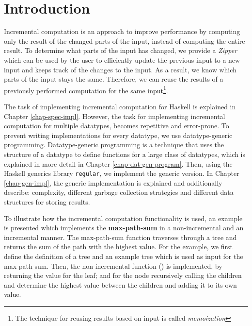 \chapter{Introduction}



Incremental computation is an approach to improve performance by computing only the result of the changed parts of the input, instead of computing the entire result. To determine what parts of the input has changed, we provide a \textit{Zipper} which can be used by the user to efficiently update the previous input to a new input and keeps track of the changes to the input. As a result, we know which parts of the input stays the same. Therefore, we can reuse the results of a previously performed computation for the same input\footnote{The technique for reusing results based on input is called \textit{memoization}}.   

The task of implementing incremental computation for Haskell is explained in Chapter \ref*{chap-spec-impl}. However, the task for implementing incremental computation for multiple datatypes, becomes repetitive and error-prone. To prevent writing implementations for every datatype, we use datatype-generic programming. Datatype-generic programming is a technique that uses the structure of a datatype to define functions for a large class of datatypes, which is explained in more detail in Chapter \ref*{chap-dat-gen-program}. Then, using the Haskell generics library \texttt{regular}, we implement the generic version. In Chapter \ref*{chap-gen-impl}, the generic implementation is explained and additionally describe: complexity, different garbage collection strategies and different data structures for storing results. 

To illustrate how the incremental computation functionality is used, an example is presented which implements the \textbf{max-path-sum} in a non-incremental and an incremental manner. The max-path-sum function traverses through a tree and returns the sum of the path with the highest value. For the example, we first define the definition of a tree and an example tree which is used as input for the max-path-sum. Then, the non-incremental function () is implemented, by returning the value for the leaf; and for the node recursively calling the children and determine the highest value between the children and adding it to its own value.

